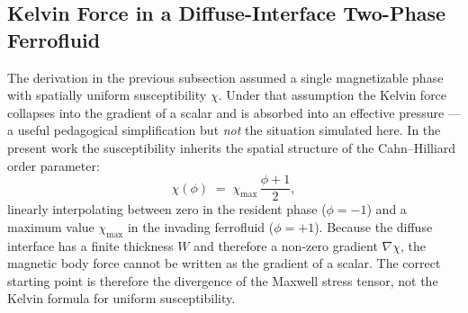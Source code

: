 \subsection{Kelvin Force in a Diffuse-Interface Two-Phase Ferrofluid}
\label{sec:kelvin-heterogeneous}

The derivation in the previous subsection assumed a single magnetizable phase with spatially uniform susceptibility $\chi$.
Under that assumption the Kelvin force collapses into the gradient of a scalar and is absorbed into an effective pressure --- a useful pedagogical simplification but \emph{not} the situation simulated here.
In the present work the susceptibility inherits the spatial structure of the Cahn--Hilliard order parameter:
\begin{equation}
\chi(\phi) \;=\; \chi_{\max}\,\frac{\phi + 1}{2},
\label{eq:chi-of-phi}
\end{equation}
linearly interpolating between zero in the resident phase ($\phi = -1$) and a maximum value $\chi_{\max}$ in the invading ferrofluid ($\phi = +1$).
Because the diffuse interface has a finite thickness $W$ and therefore a non-zero gradient $\nabla\chi$, the magnetic body force cannot be written as the gradient of a scalar.
The correct starting point is therefore the divergence of the Maxwell stress tensor, not the Kelvin formula for uniform susceptibility.

